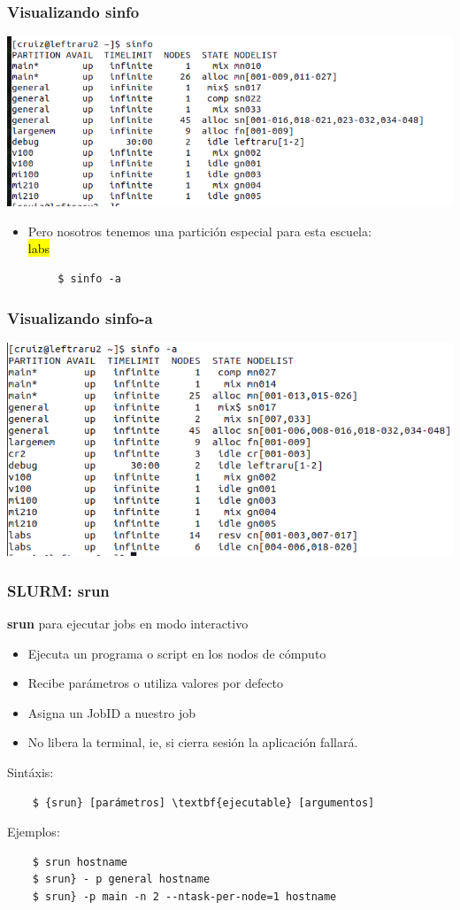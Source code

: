 \documentclass[aspectratio=169,professionalfonts]{beamer}
\begin{document}
\begin{frame}[fragile]
\frametitle{\textbf{Visualizando sinfo}}
  \centering
    \includegraphics[scale=0.3]{FIGURES/sinfo.png}   
    \begin{itemize}
        \item Pero nosotros tenemos una partición especial para esta escuela:  \\ \hl{labs} 
    \end{itemize}
    \begin{verbatim}
        $ sinfo -a 
    \end{verbatim}
\end{frame}
\begin{frame}[fragile]
\frametitle{\textbf{Visualizando sinfo-a}}
\centering
\includegraphics[scale=0.3]{FIGURES/sinfo-a.png}
\end{frame}


\begin{frame}[fragile]
\frametitle{\textbf{SLURM: srun}}
\textbf{srun} para ejecutar jobs en modo interactivo 
\begin{itemize}
    \item Ejecuta un programa o script en los nodos de cómputo
    \item Recibe parámetros o utiliza valores por defecto
    \item Asigna un JobID  a nuestro job
    \item No libera la terminal, ie, si cierra sesión la aplicación fallará. 
\end{itemize}
    Sintáxis: 
\begin{verbatim}
    $ {srun} [parámetros] \textbf{ejecutable} [argumentos]
\end{verbatim}

   
    Ejemplos: 

\begin{verbatim}
    $ srun hostname
    $ srun} - p general hostname
    $ srun} -p main -n 2 --ntask-per-node=1 hostname
\end{verbatim}
 
\end{frame}
\end{document}
